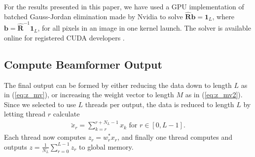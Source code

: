 \documentclass[journal]{IEEEtran}
\newcommand{\mat}[1]{\mathbf{#1}}
\renewcommand{\vec}[1]{\mathbf{#1}}
\begin{document}
For the results presented in this paper, we have used a GPU implementation of batched Gauss-Jordan elimination made by Nvidia to solve $\mat{\hat{R}}\vec{b} = \vec{1}_L$, where $\vec{b} = \mat{\hat{R}}^{-1}\vec{1}_L$, for all pixels in an image in one kernel launch. The solver is available online for registered CUDA developers \cite{Nvidiaa}.%





\subsection{Compute Beamformer Output}
The final output can be formed by either reducing the data down to length $L$ as in (\ref{eq:z_mv}), or increasing the weight vector to length $M$ as in (\ref{eq:z_mv2}). Since we selected to use $L$ threads per output, the data is reduced to length $L$ by letting thread $r$ calculate 
\begin{align}\label{eq:subsum}
\breve{x}_{r} = \sum_{k=r}^{r+N_L-1}x_{k} \text{ for } r \in [0, L-1].
\end{align}
Each thread now computes $z_r = w_r^*x_r$, and finally one thread computes and outputs $z = \frac{1}{N_L}\sum_{r=0}^{L-1} z_r$ to global memory. %
\end{document}
